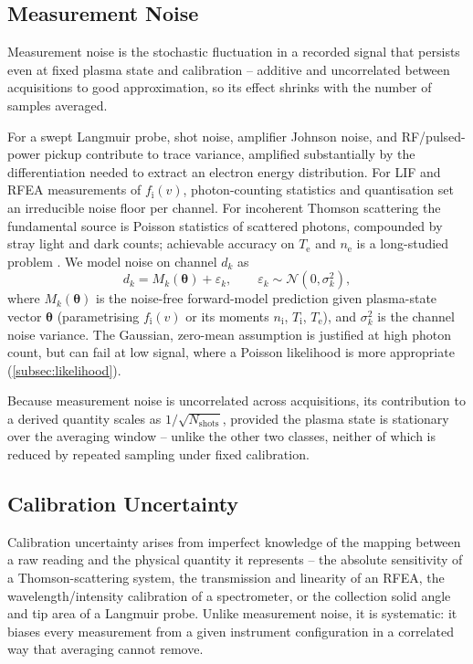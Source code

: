 \subsection{Measurement Noise}
\label{subsec:meas-noise}

Measurement noise is the stochastic fluctuation in a recorded signal that persists even at fixed plasma state and calibration -- additive and uncorrelated between acquisitions to good approximation, so its effect shrinks with the number of samples averaged.

For a swept Langmuir probe, shot noise, amplifier Johnson noise, and RF/pulsed-power pickup contribute to trace variance, amplified substantially by the differentiation needed to extract an electron energy distribution. For LIF and RFEA measurements of $f_{\mathrm{i}}(v)$, photon-counting statistics and quantisation set an irreducible noise floor per channel. For incoherent Thomson scattering the fundamental source is Poisson statistics of scattered photons, compounded by stray light and dark counts; achievable accuracy on $T_{\mathrm{e}}$ and $n_{\mathrm{e}}$ is a long-studied problem \cite{ref0384,ref0355}. We model noise on channel $d_{k}$ as
\begin{equation}
d_{k} = M_{k}(\boldsymbol{\theta}) + \varepsilon_{k}, \qquad \varepsilon_{k} \sim \mathcal{N}\!\left(0, \sigma_{k}^{2}\right),
\label{eq:noise-model}
\end{equation}
where $M_{k}(\boldsymbol{\theta})$ is the noise-free forward-model prediction given plasma-state vector $\boldsymbol{\theta}$ (parametrising $f_{\mathrm{i}}(v)$ or its moments $n_{\mathrm{i}}$, $T_{\mathrm{i}}$, $T_{\mathrm{e}}$), and $\sigma_{k}^{2}$ is the channel noise variance. The Gaussian, zero-mean assumption is justified at high photon count, but can fail at low signal, where a Poisson likelihood is more appropriate (\cref{subsec:likelihood}).

Because measurement noise is uncorrelated across acquisitions, its contribution to a derived quantity scales as $1/\sqrt{N_{\text{shots}}}$, provided the plasma state is stationary over the averaging window -- unlike the other two classes, neither of which is reduced by repeated sampling under fixed calibration.

\subsection{Calibration Uncertainty}
\label{subsec:calib}

Calibration uncertainty arises from imperfect knowledge of the mapping between a raw reading and the physical quantity it represents -- the absolute sensitivity of a Thomson-scattering system, the transmission and linearity of an RFEA, the wavelength/intensity calibration of a spectrometer, or the collection solid angle and tip area of a Langmuir probe. Unlike measurement noise, it is systematic: it biases every measurement from a given instrument configuration in a correlated way that averaging cannot remove.

